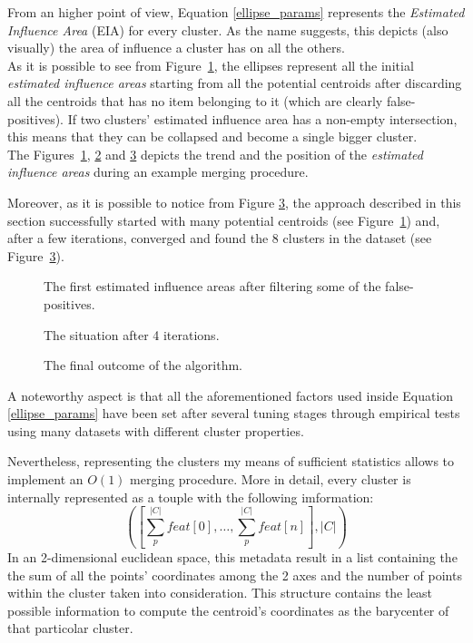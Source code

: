 From an higher point of view, Equation \ref{ellipse_params} represents the \emph{Estimated Influence Area}
(EIA) for every cluster. As the name suggests, this depicts (also visually) the area of influence a 
cluster has on all the others.\\
As it is possible to see from Figure~\ref{start}, the ellipses represent all the initial
\emph{estimated influence areas} starting from all the potential centroids after discarding
all the centroids that has no item belonging to it (which are clearly false-positives).
If two clusters' estimated influence area has a non-empty intersection, this
means that they can be collapsed and become a single bigger cluster.\\
The Figures~\ref{start}, \ref{middle} and \ref{end} depicts the trend and the position of the
\emph{estimated influence areas} during an example merging procedure.

Moreover, as it is possible to notice from Figure \ref{end}, the approach described in this
section successfully started with many potential centroids (see Figure~\ref{start}) and, after a
few iterations, converged and found the 8 clusters in the dataset (see Figure~\ref{end}). 

\begin{figure}[t]
  \caption{The first estimated influence areas after filtering some of the false-positives.}
  \label{start}
\end{figure}

\begin{figure}[t]
  \caption{The situation after 4 iterations.}
  \label{middle}
\end{figure}

\begin{figure}[t]
  \caption{The final outcome of the algorithm.}
  \label{end}
\end{figure}

A noteworthy aspect is that all the aforementioned factors used inside Equation \ref{ellipse_params} have
been set after several tuning stages through empirical tests using many datasets with different
cluster properties.

Nevertheless, representing the clusters my means of sufficient statistics allows to implement an $O(1)$
merging procedure. More in detail, every cluster is internally represented as a touple with the
following imformation:
\begin{equation*}
    \left(\left[\sum_{p}^{|C|} feat[0],\dots,\sum_{p}^{|C|} feat[n]\right],|C|\right)
\end{equation*}
In an 2-dimensional euclidean space, this metadata result in a list containing the the sum of all the
points' coordinates among the 2 axes and the number of points within the cluster taken into consideration.
This structure contains the least possible information to compute the centroid's coordinates as the
barycenter of that particolar cluster.  

